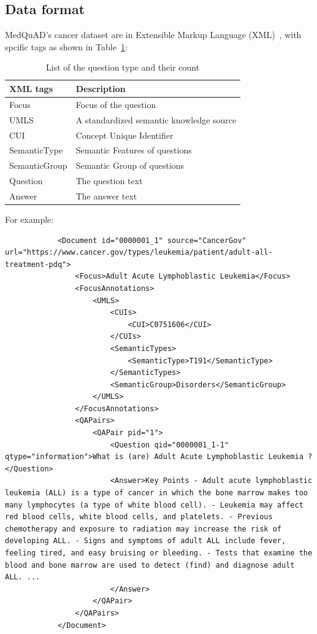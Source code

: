  
 	\subsection*{Data format}
 		MedQuAD's cancer dataset are in Extensible Markup Language (XML)~\cite{MedQuAD-Cancer-dataset}, with spcific tags as shown in Table~\ref{tab:xml-tag}:
 		 	\begin{table}[ht]
 			\caption{List of the question type and their count}
 			\label{tab:xml-tag}
 			\begin{tabular}{ll}
 				\toprule
 				XML tags&Description\\
 				\midrule
 				Focus & Focus of the question\\
 				UMLS & A standardized semantic knowledge source\\
 				CUI & Concept Unique Identifier \\
 				SemanticType &  Semantic Features of questions \\
 				SemanticGroup & Semantic Group of questions\\
 				Question & The question text\\
 				Answer & The answer text\\
 				\bottomrule
 			\end{tabular}
 		\end{table}
 		
	 	For example:
	 	\begin{lstlisting}
	 		<Document id="0000001_1" source="CancerGov" url="https://www.cancer.gov/types/leukemia/patient/adult-all-treatment-pdq">
	 			<Focus>Adult Acute Lymphoblastic Leukemia</Focus>
	 			<FocusAnnotations>
 					<UMLS>
				 		<CUIs>
				 			<CUI>C0751606</CUI>
				 		</CUIs>
				 		<SemanticTypes>
				 			<SemanticType>T191</SemanticType>
				 		</SemanticTypes>
				 		<SemanticGroup>Disorders</SemanticGroup>
		 			</UMLS>
	 			</FocusAnnotations>
	 			<QAPairs>
		 			<QAPair pid="1">
			 			<Question qid="0000001_1-1" qtype="information">What is (are) Adult Acute Lymphoblastic Leukemia ?</Question>
			 			<Answer>Key Points - Adult acute lymphoblastic leukemia (ALL) is a type of cancer in which the bone marrow makes too many lymphocytes (a type of white blood cell). - Leukemia may affect red blood cells, white blood cells, and platelets. - Previous chemotherapy and exposure to radiation may increase the risk of developing ALL. - Signs and symptoms of adult ALL include fever, feeling tired, and easy bruising or bleeding. - Tests that examine the blood and bone marrow are used to detect (find) and diagnose adult ALL. ...
			 			</Answer>
	 				</QAPair>
	 			</QAPairs>
	 		</Document>
	 	\end{lstlisting}
		
